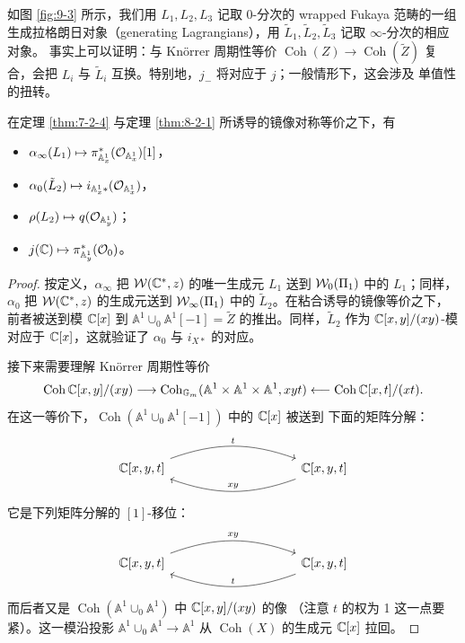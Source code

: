 如图 \ref{fig:9-3} 所示，我们用 $L_1,L_2,L_3$ 记取 0-分次的 wrapped Fukaya 范畴的一组
生成拉格朗日对象（generating Lagrangians），用 $\tilde L_1,\tilde L_2,\tilde L_3$ 记取 $\infty$-分次的相应对象。
事实上可以证明：与 Knörrer 周期性等价 $\operatorname{Coh}(Z)\to\operatorname{Coh}(\tilde Z)$
复合，会把 $L_i$ 与 $\tilde L_i$ 互换。特别地，$j_-$ 将对应于 $j$；一般情形下，这会涉及
单值性的扭转。


\begin{proposition}\label{prop:9-1-1}
在定理 \ref{thm:7-2-4} 与定理 \ref{thm:8-2-1} 所诱导的镜像对称等价之下，有
\begin{itemize}[leftmargin=2em,itemsep=0.2em]
\item $\alpha_\infty(L_1)\mapsto\pi_{\mathbb A^1_x}^*(\mathcal{O}_{\mathbb A^1_x})[1]$，


\item $\alpha_0(\tilde L_2)\mapsto i_{\mathbb A^1_x*}(\mathcal{O}_{\mathbb A^1_x})$，
\item $\rho(L_2)\mapsto q(\mathcal{O}_{\mathbb A^1_y})$；
\item $j(\mathbb{C})\mapsto\pi_{\mathbb A^1_y}^*(\mathcal{O}_0)$。
\end{itemize}
\end{proposition}


\begin{proof}
按定义，$\alpha_\infty$ 把 $\mathcal{W}(\mathbb{C}^*,z)$ 的唯一生成元 $L_1$ 送到 $\mathcal{W}_0(\Pi_1)$ 中的
$L_1$；同样，$\alpha_0$ 把 $\mathcal{W}(\mathbb{C}^*,z)$ 的生成元送到 $\mathcal{W}_\infty(\Pi_1)$ 中的
$\tilde L_2$。在粘合诱导的镜像等价之下，前者被送到模 $\mathbb{C}[x]$ 到
$\mathbb A^1\cup_0\mathbb A^1[-1]=\tilde Z$ 的推出。同样，$\tilde L_2$ 作为
$\mathbb{C}[x,y]/(xy)$-模对应于 $\mathbb{C}[x]$，这就验证了 $\alpha_0$ 与 $i_{X*}$ 的对应。

接下来需要理解 Knörrer 周期性等价
\[
\operatorname{Coh}\mathbb{C}[x,y]/(xy)\longrightarrow
\operatorname{Coh}_{\mathbb G_m}(\mathbb A^1\times\mathbb A^1\times\mathbb A^1,xyt)
\longleftarrow\operatorname{Coh}\mathbb{C}[x,t]/(xt).
\]
在这一等价下，$\operatorname{Coh}(\mathbb A^1\cup_0\mathbb A^1[-1])$ 中的 $\mathbb{C}[x]$ 被送到
下面的矩阵分解：
\[
\begin{tikzcd}[row sep=1.4em, column sep=5em]
\C[x,y,t] \arrow[rr,bend left=20,"t"] & & \C[x,y,t] \arrow[ll,bend left=20,"xy"']
\end{tikzcd}
\]
它是下列矩阵分解的 $[1]$-移位：
\[
\begin{tikzcd}[row sep=1.4em, column sep=5em]
\C[x,y,t] \arrow[rr,bend left=20,"xy"] & & \C[x,y,t] \arrow[ll,bend left=20,"t"']
\end{tikzcd}
\]
而后者又是 $\operatorname{Coh}(\mathbb A^1\cup_0\mathbb A^1)$ 中 $\mathbb{C}[x,y]/(xy)$ 的像
（注意 $t$ 的权为 1 这一点要紧）。这一模沿投影 $\mathbb A^1\cup_0\mathbb A^1\to\mathbb A^1$
从 $\operatorname{Coh}(X)$ 的生成元 $\mathbb{C}[x]$ 拉回。
\end{proof}

